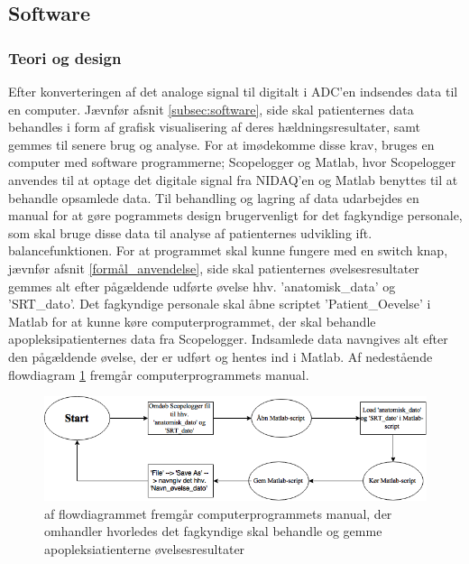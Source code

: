 \subsection{Software}
\subsubsection{Teori og design}
Efter konverteringen af det analoge signal til digitalt i ADC’en indsendes data til en computer. Jævnfør afsnit \ref{subsec:software}, side \pageref{subsec:software} skal patienternes data behandles i form af grafisk visualisering af deres hældningsresultater, samt gemmes til senere brug og analyse. For at imødekomme disse krav, bruges en computer med software programmerne; Scopelogger og Matlab, hvor Scopelogger anvendes til at optage det  digitale signal fra NIDAQ'en og Matlab benyttes til at behandle opsamlede data. Til behandling og lagring af data udarbejdes en manual for at gøre pogrammets design brugervenligt for det fagkyndige personale, som skal bruge disse data til analyse af patienternes udvikling ift. balancefunktionen. For at programmet skal kunne fungere med en switch knap, jævnfør afsnit \ref{formål_anvendelse}, side \pageref{formål_anvendelse} skal patienternes øvelsesresultater gemmes alt efter pågældende udførte øvelse hhv. 'anatomisk\_data' og 'SRT\_dato'. 
Det fagkyndige personale skal åbne scriptet 'Patient\_Oevelse' i Matlab for at kunne køre computerprogrammet, der skal behandle apopleksipatienternes data fra Scopelogger. Indsamlede data navngives alt efter den pågældende øvelse, der er udført og hentes ind i Matlab. Af nedestående flowdiagram \ref{Flow_manual} fremgår computerprogrammets manual.

\begin{figure}[H] 
	\centering 
	\includegraphics[scale=0.5]{figures/cProblemloesning/Flow_manual.PNG}
	\caption{af flowdiagrammet fremgår computerprogrammets manual, der omhandler hvorledes det fagkyndige skal behandle og gemme apopleksiatienterne øvelsesresultater}
	\label{Flow_manual}
\end{figure} 

